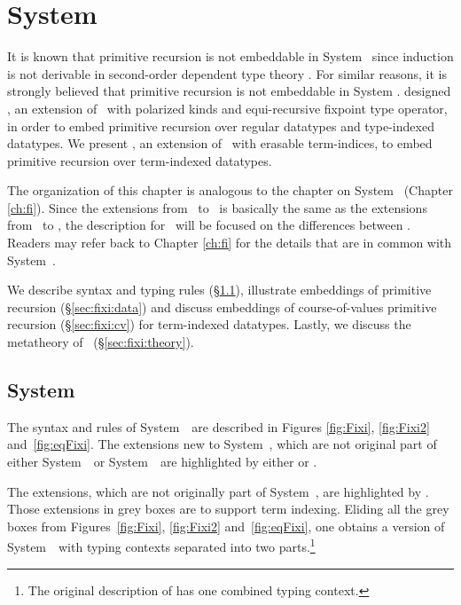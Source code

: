 \chapter{System \Fixi}\label{ch:fixi}

It is known that primitive recursion is not embeddable in System \F\ since
induction is not derivable in second-order dependent type theory
\cite{Geuvers01}. For similar reasons, it is strongly believed that
primitive recursion is not embeddable in System \Fw. 
\citet{AbeMat04} designed \Fixw, an extension of \Fw\ with polarized kinds and
equi-recursive fixpoint type operator, in order to embed primitive recursion
over regular datatypes and type-indexed datatypes.
We present \Fixi, an extension of \Fixw\ with erasable term-indices,
to embed primitive recursion over term-indexed datatypes.

The organization of this chapter is analogous to the chapter on System \Fi\
(Chapter \ref{ch:fi}). Since the extensions from \Fixw\ to \Fixi\ is
basically the same as the extensions from \Fw\ to \Fi,
the description for \Fixi\ will be focused on the differences between \Fi.
Readers may refer back to Chapter \ref{ch:fi} for the details that are
in common with System~\Fi.

We describe syntax and typing rules (\S\ref{sec:fixi:def}),
illustrate embeddings of primitive recursion (\S\ref{sec:fixi:data})
and discuss embeddings of course-of-values primitive recursion
(\S\ref{sec:fixi:cv}) for term-indexed datatypes. Lastly, we
discuss the metatheory of \Fixi\ (\S\ref{sec:fixi:theory}).

\section{System \Fixi} \label{sec:fixi:def}
The syntax and rules of System~\Fi\ are described in
Figures \ref{fig:Fixi}, \ref{fig:Fixi2} and~\ref{fig:eqFixi}.
The extensions new to System~\Fixi, which are not original part of
either System~\Fw\ or System~\Fixw\ are highlighted by either
 or .

The extensions, which are not originally part of System~\Fixw, are highlighted
by \newFi{\text{grey boxes}}. Those extensions in grey boxes are to support
term indexing.  Eliding all the grey boxes from Figures~\ref{fig:Fixi},
\ref{fig:Fixi2} and~\ref{fig:eqFixi},
one obtains a version of System~\Fixw\ with typing contexts separated into
two parts.\footnote{The original description of \Fixw \cite{AbeMat04} has
one combined typing context.}

